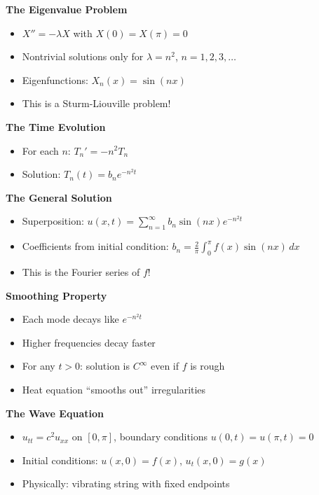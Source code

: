 \documentclass[
  10pt,
  letterpaper,
]{scrbook}
\providecommand{\tightlist}{%
  \setlength{\itemsep}{0pt}\setlength{\parskip}{0pt}}
\begin{document}
\textbf{The Eigenvalue Problem}

\begin{itemize}
\tightlist
\item
  \(X'' = -\lambda X\) with \(X(0) = X(\pi) = 0\)
\item
  Nontrivial solutions only for \(\lambda = n^2\),
  \(n = 1, 2, 3, \ldots\)
\item
  Eigenfunctions: \(X_n(x) = \sin(nx)\)
\item
  This is a Sturm-Liouville problem!
\end{itemize}

\textbf{The Time Evolution}

\begin{itemize}
\tightlist
\item
  For each \(n\): \(T_n' = -n^2 T_n\)
\item
  Solution: \(T_n(t) = b_n e^{-n^2 t}\)
\end{itemize}

\textbf{The General Solution}

\begin{itemize}
\tightlist
\item
  Superposition: \(u(x, t) = \sum_{n=1}^\infty b_n \sin(nx) e^{-n^2 t}\)
\item
  Coefficients from initial condition:
  \(b_n = \frac{2}{\pi}\int_0^\pi f(x)\sin(nx)\, dx\)
\item
  This is the Fourier series of \(f\)!
\end{itemize}

\textbf{Smoothing Property}

\begin{itemize}
\tightlist
\item
  Each mode decays like \(e^{-n^2 t}\)
\item
  Higher frequencies decay faster
\item
  For any \(t > 0\): solution is \(C^\infty\) even if \(f\) is rough
\item
  Heat equation ``smooths out'' irregularities
\end{itemize}

\textbf{The Wave Equation}

\begin{itemize}
\tightlist
\item
  \(u_{tt} = c^2 u_{xx}\) on \([0, \pi]\), boundary conditions
  \(u(0, t) = u(\pi, t) = 0\)
\item
  Initial conditions: \(u(x, 0) = f(x)\), \(u_t(x, 0) = g(x)\)
\item
  Physically: vibrating string with fixed endpoints
\end{itemize}
\end{document}
